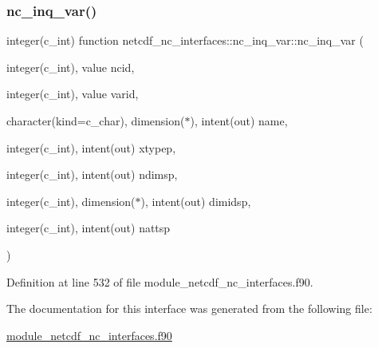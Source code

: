 \subsubsection{\texorpdfstring{nc\+\_\+inq\+\_\+var()}{nc\_inq\_var()}}
{\footnotesize\ttfamily integer(c\+\_\+int) function netcdf\+\_\+nc\+\_\+interfaces\+::nc\+\_\+inq\+\_\+var\+::nc\+\_\+inq\+\_\+var (\begin{DoxyParamCaption}\item[{integer(c\+\_\+int), value}]{ncid,  }\item[{integer(c\+\_\+int), value}]{varid,  }\item[{character(kind=c\+\_\+char), dimension($\ast$), intent(out)}]{name,  }\item[{integer(c\+\_\+int), intent(out)}]{xtypep,  }\item[{integer(c\+\_\+int), intent(out)}]{ndimsp,  }\item[{integer(c\+\_\+int), dimension($\ast$), intent(out)}]{dimidsp,  }\item[{integer(c\+\_\+int), intent(out)}]{nattsp }\end{DoxyParamCaption})}



Definition at line 532 of file module\+\_\+netcdf\+\_\+nc\+\_\+interfaces.\+f90.



The documentation for this interface was generated from the following file\+:\begin{DoxyCompactItemize}
\item 
\hyperlink{module__netcdf__nc__interfaces_8f90}{module\+\_\+netcdf\+\_\+nc\+\_\+interfaces.\+f90}\end{DoxyCompactItemize}
